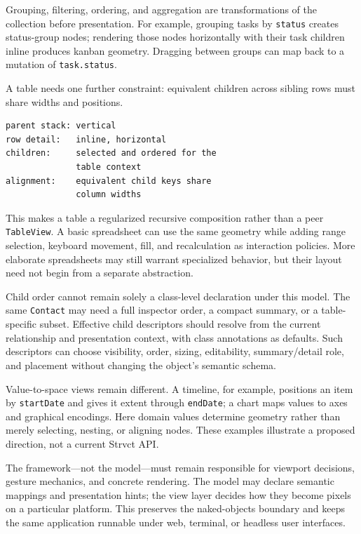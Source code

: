 \documentclass[sigplan,review,anonymous,10pt]{acmart}
\begin{document}
Grouping, filtering, ordering, and aggregation are transformations of the collection before presentation. For example, grouping tasks by \texttt{status} creates status-group nodes; rendering those nodes horizontally with their task children inline produces kanban geometry. Dragging between groups can map back to a mutation of \texttt{task.status}.

A table needs one further constraint: equivalent children across sibling rows must share widths and positions.

\begin{verbatim}
parent stack: vertical
row detail:   inline, horizontal
children:     selected and ordered for the
              table context
alignment:    equivalent child keys share
              column widths
\end{verbatim}

This makes a table a regularized recursive composition rather than a peer \texttt{TableView}. A basic spreadsheet can use the same geometry while adding range selection, keyboard movement, fill, and recalculation as interaction policies. More elaborate spreadsheets may still warrant specialized behavior, but their layout need not begin from a separate abstraction.

Child order cannot remain solely a class-level declaration under this model. The same \texttt{Contact} may need a full inspector order, a compact summary, or a table-specific subset. Effective child descriptors should resolve from the current relationship and presentation context, with class annotations as defaults. Such descriptors can choose visibility, order, sizing, editability, summary/detail role, and placement without changing the object's semantic schema.

Value-to-space views remain different. A timeline, for example, positions an item by \texttt{startDate} and gives it extent through \texttt{endDate}; a chart maps values to axes and graphical encodings. Here domain values determine geometry rather than merely selecting, nesting, or aligning nodes. These examples illustrate a proposed direction, not a current Strvct API.

The framework---not the model---must remain responsible for viewport decisions, gesture mechanics, and concrete rendering. The model may declare semantic mappings and presentation hints; the view layer decides how they become pixels on a particular platform. This preserves the naked-objects boundary and keeps the same application runnable under web, terminal, or headless user interfaces.
\end{document}
